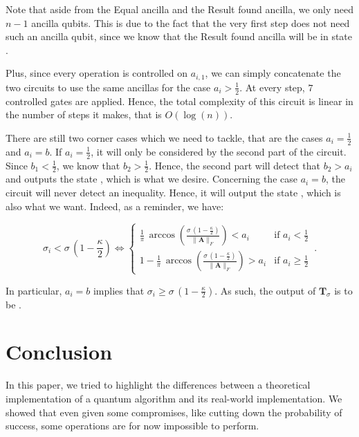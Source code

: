 \documentclass[11pt, a4paper]{article}
\begin{document}
                Note that aside from the Equal ancilla and the Result found ancilla, we only need \(n - 1\) ancilla qubits. This is due to the fact that the very first step does not need such an ancilla qubit, since we know that the Result found ancilla will be in state .
                
                Plus, since every operation is controlled on \(a_{i,1}\), we can simply concatenate the two circuits to use the same ancillas for the case \(a_i>\frac12\). At every step, \(7\) controlled gates are applied. Hence, the total complexity of this circuit is linear in the number of steps it makes, that is \(O(\log(n))\).
                
                There are still two corner cases which we need to tackle, that are the cases \(a_i=\frac12\) and \(a_i=b\). If \(a_i=\frac12\), it will only be considered by the second part of the circuit. Since \(b_1<\frac12\), we know that \(b_2>\frac12\). Hence, the second part will detect that \(b_2>a_i\) and outputs the state , which is what we desire. Concerning the case \(a_i=b\), the circuit will never detect an inequality. Hence, it will output the state , which is also what we want. Indeed, as a reminder, we have:
                
                \[\sigma_i < \sigma\,\left(1 - \frac\kappa2\right)\iff\begin{cases}\frac1\pi\,\arccos\left(\frac{\sigma\,\left(1 - \frac\kappa2\right)}{\|\mathbf{A}\|_F}\right) < a_i&\text{if }a_i<\frac12\\1-\frac1\pi\,\arccos\left(\frac{\sigma\,\left(1 - \frac\kappa2\right)}{\|\mathbf{A}\|_F}\right) > a_i&\text{if }a_i\geqslant\frac12\end{cases}\,.\]
                
                In particular, \(a_i=b\) implies that \(\sigma_i \geqslant \sigma\,\left(1 - \frac\kappa2\right)\). As such, the output of \(\mathbf{T}_\sigma\) is to be .
                
    \section{Conclusion}
        In this paper, we tried to highlight the differences between a theoretical implementation of a quantum algorithm and its real-world implementation. We showed that even given some compromises, like cutting down the probability of success, some operations are for now impossible to perform.
        
\end{document}
